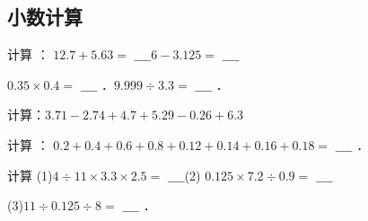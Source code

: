 \begin{onlytopic}
	\chapter{小数计算}
\end{onlytopic}

\begin{zuoye}
	\begin{problems}
		计算 ：		
		$12.7+5.63=$ $\_\_\_\_$\hfil $6-3.125=$ $\_\_\_\_$ 
		
		 $0.35 \times 0.4=$ $\_\_\_\_$ ．\hfil  $9.999 \div 3.3=$ $\_\_\_\_$ ．
	\end{problems} 
	
	\begin{lxsol}
		\vspace{\solthreeproblems}
	\end{lxsol}
\end{zuoye}

\begin{zuoye}
	\begin{problems}
		计算：$3.71-2.74+4.7+5.29-0.26+6.3$
	\end{problems} 
	
	\begin{lxSsol}
		\vspace{\solthreeproblems}
	\end{lxSsol}
\end{zuoye}

\begin{zuoye}
	\begin{problems}
		计算 ： $0.2+0.4+0.6+0.8+0.12+0.14+0.16+0.18=$ $\_\_\_\_$ ．
	\end{problems} 
	
	\begin{lxSsol}
		\vspace{\solthreeproblems}
	\end{lxSsol}
\end{zuoye}

\begin{zuoye}
	\begin{problems}
		计算 (1)$4 \div 11 \times 3.3 \times 2.5=$ $\_\_\_\_$\hfil  (2) $0.125 \times 7.2 \div 0.9=$ $\_\_\_\_$
		
		(3)$11 \div 0.125 \div 8=$ $\_\_\_\_$ ．
	\end{problems} 
	
	\begin{lxMsol}
		\vspace{\solthreeproblems}
	\end{lxMsol}
\end{zuoye}


